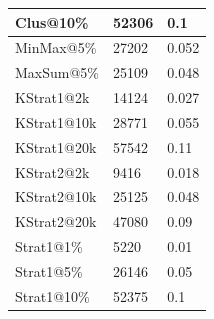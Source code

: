 \begin{figure}[!t]
\begin{minipage}[t]{0.495\columnwidth}
{\begin{tabular}{|l|l|l|}
Clus@10\%                                                    & 52306                                                  & 0.1                                                     \\ \hline
MinMax@5\%                                                   & 27202                                                  & 0.052                                                   \\ \hline
MaxSum@5\%                                                   & 25109                                                  & 0.048                                                   \\ \hline
KStrat1@2k                                                   & 14124                                                  & 0.027                                                   \\ \hline
KStrat1@10k                                                  & 28771                                                  & 0.055                                                   \\ \hline
KStrat1@20k                                                  & 57542                                                  & 0.11                                                    \\ \hline
KStrat2@2k                                                   & 9416                                                   & 0.018                                                   \\ \hline
KStrat2@10k                                                  & 25125                                                  & 0.048                                                   \\ \hline
KStrat2@20k                                                  & 47080                                                  & 0.09                                                    \\ \hline
Strat1@1\%                                                   & 5220                                                   & 0.01                                                    \\ \hline
Strat1@5\%                                                   & 26146                                                  & 0.05                                                    \\ \hline
Strat1@10\%                                                  & 52375                                                  & 0.1                                                     \\ \hline

\end{tabular}}
\end{minipage}
\end{figure}
